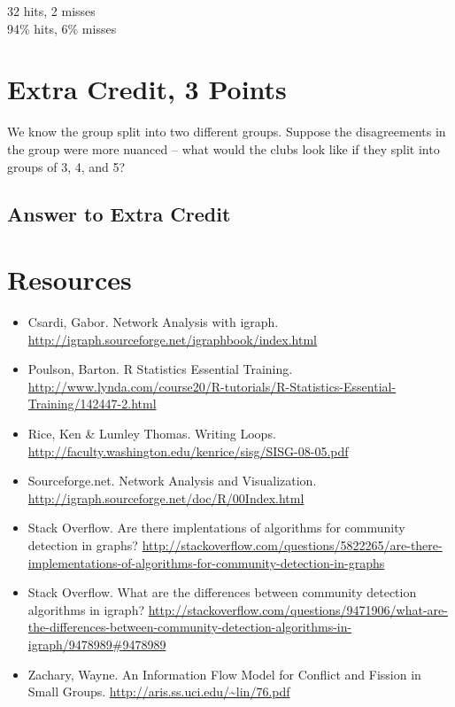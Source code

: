 \documentclass{article}
\begin{document}
32 hits, 2 misses \\
94\% hits, 6\% misses \\

\newpage

\section*{Extra Credit, 3 Points}

We know the group split into two different groups. Suppose the disagreements in the group were more nuanced -- what would the clubs look like if they split into groups of 3, 4, and 5?


\subsection*{Answer to Extra Credit}





\newpage

\section*{Resources}

\begin{itemize}
\item Csardi, Gabor. Network Analysis with igraph. \url{http://igraph.sourceforge.net/igraphbook/index.html}
\item Poulson, Barton. R Statistics Essential Training. \url{http://www.lynda.com/course20/R-tutorials/R-Statistics-Essential-Training/142447-2.html}
\item Rice, Ken \& Lumley Thomas. Writing Loops. \url{http://faculty.washington.edu/kenrice/sisg/SISG-08-05.pdf}
\item Sourceforge.net. Network Analysis and Visualization. \url{http://igraph.sourceforge.net/doc/R/00Index.html}
\item Stack Overflow. Are there implentations of algorithms for community detection in graphs? \url{http://stackoverflow.com/questions/5822265/are-there-implementations-of-algorithms-for-community-detection-in-graphs}
\item Stack Overflow. What are the differences between community detection algorithms in igraph? \url{http://stackoverflow.com/questions/9471906/what-are-the-differences-between-community-detection-algorithms-in-igraph/9478989#9478989}
\item Zachary, Wayne. An Information Flow Model for Conflict and Fission in Small Groups. \url{http://aris.ss.uci.edu/~lin/76.pdf}


\end{itemize}
\end{document}
